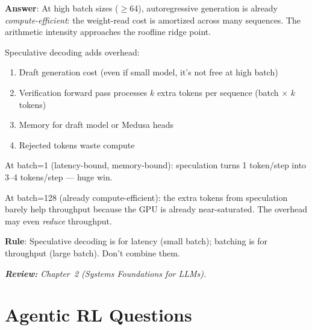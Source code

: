 \begin{questionbox}
\textbf{Answer}: At high batch sizes ($\geq$64), autoregressive generation is already \emph{compute-efficient}: the weight-read cost is amortized across many sequences. The arithmetic intensity approaches the roofline ridge point.

Speculative decoding adds overhead:

\begin{enumerate}
  \item Draft generation cost (even if small model, it’s not free at high batch)
  \item Verification forward pass processes $k$ extra tokens per sequence (batch $\times$ $k$ tokens)
  \item Memory for draft model or Medusa heads
  \item Rejected tokens waste compute
\end{enumerate}

At batch=1 (latency-bound, memory-bound): speculation turns 1 token/step into 3--4 tokens/step --- huge win.

At batch=128 (already compute-efficient): the extra tokens from speculation barely help throughput because the GPU is already near-saturated. The overhead may even \emph{reduce} throughput.

\textbf{Rule}: Speculative decoding is for latency (small batch); batching is for throughput (large batch). Don’t combine them.

\emph{\textbf{Review:} Chapter~2 (Systems Foundations for LLMs).}
\end{questionbox}

\section{Agentic RL Questions}
\label{agentic-rl-questions}

